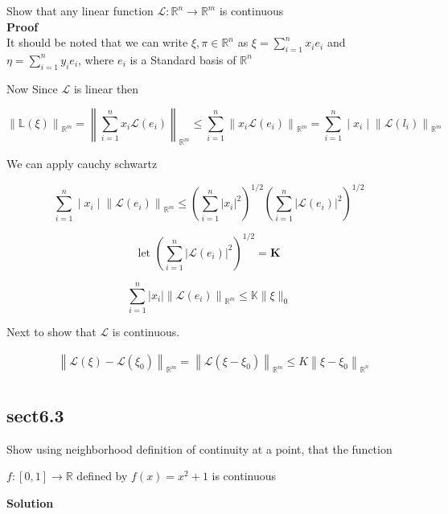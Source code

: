 \documentclass{article}
\begin{document}
Show that any linear function $\mathcal{L}: \mathbb{R}^{n} \rightarrow \mathbb{R}^{m}$ is continuous\\


\textbf{Proof}\\

It should be noted that we can write $\xi, \pi \in \mathbb{R}^{n}$ as $\xi=\sum_{i=1}^{n} x_{i} e_{i}$ and $\eta=\sum_{i=1}^{n} y_{i} e_{i}$, where $e_{i}$ is a Standard basis of $\mathbb{R}^{n}$

 Now Since $\mathcal{L}$ is linear then

$$
\left\|\mathbb{L}(\xi)\right\|_{\mathbb{R}^{m}}=\left\|\sum_{i=1}^{n} x_{i} \mathcal{L}\left(e_{i}\right)\right\|_{\mathbb{R}^{m}} \leq \sum_{i=1}^{n}\left\|x_{i} \mathcal{L}\left(e_{i}\right)\right\|_{\mathbb{R}^{m}}=\sum_{i=1}^{n} \mid x_{i}\mid\left\|\mathcal{L}\left(l_{i}\right)\right\|_{\mathbb{R}^{m}}
$$

We can apply cauchy schwartz

$$
\sum_{i=1}^{n}\mid x_{i}\mid \left \| \mathcal{L}\left(e_{i}\right)\right\|_{\mathbb{R}^{m}} \leq\left(\sum_{i=1}^{n}\left|x_{i}\right|^{2}\right)^{1 / 2}\left(\sum_{i=1}^{n}\left|\mathcal{L}\left(e_{i}\right)\right|^{2}\right)^{1 / 2}$$

$$
\text{let } \left(\sum_{i=1}^{n}\left|\mathcal{L}\left(e_{i}\right)\right|^{2}\right)^{1 / 2}=\mathbf{K}$$

$$\sum_{i=1}^{n}\left|x_{i}\right|\left\| \mathcal{L}\left(e_{i}\right)\right\|_{\mathbb{R}^{m}} \leq \mathbb{K} \| \xi \|_{0}
$$

Next to show that $\mathcal{L}$ is continuous.

$$
\begin{aligned}
& \left\|\mathcal{L}(\xi)-\mathcal{L}\left(\xi_{0}\right)\right\|_{\mathbb{R}^{m}}=\left\|\mathcal{L}\left(\xi-\xi_{0}\right)\right\|_{\mathbb{R}^{m}} \leq K\left\|\xi-\xi_{0}\right\|_{\mathbb{R}^{n}} \\
\end{aligned}
$$



\subsection{ sect6.3 }
Show using neighborhood definition of continuity at a point, that the function

$f :  \left[ 0,1\right]  \rightarrow \mathbb{R}$ defined by $f(x)=x^2+1$ is continuous 

\textbf{Solution}\\
\end{document}
